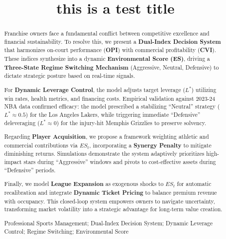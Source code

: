 \documentclass{mcmthesis}
\title{this is a test title}
\begin{document}
\begin{abstract}
Franchise owners face a fundamental conflict between competitive excellence and financial sustainability. To resolve this, we present a \textbf{Dual-Index Decision System} that harmonizes on-court performance (\textbf{OPI}) with commercial profitability (\textbf{CVI}). These indices synthesize into a dynamic \textbf{Environmental Score (ES)}, driving a \textbf{Three-State Regime Switching Mechanism} (Aggressive, Neutral, Defensive) to dictate strategic posture based on real-time signals.

For \textbf{Dynamic Leverage Control}, the model adjusts target leverage ($L^*$) utilizing win rates, health metrics, and financing costs. Empirical validation against 2023-24 NBA data confirmed efficacy: the model prescribed a stabilizing ``Neutral'' strategy ($L^* \approx 0.5$) for the Los Angeles Lakers, while triggering immediate ``Defensive'' deleveraging ($L^* \approx 0$) for the injury-hit Memphis Grizzlies to preserve solvency.

Regarding \textbf{Player Acquisition}, we propose a framework weighting athletic and commercial contributions via $ES_t$, incorporating a \textbf{Synergy Penalty} to mitigate diminishing returns. Simulations demonstrate the system adaptively prioritizes high-impact stars during ``Aggressive'' windows and pivots to cost-effective assets during ``Defensive'' periods.

Finally, we model \textbf{League Expansion} as exogenous shocks to $ES_t$ for automatic recalibration and integrate \textbf{Dynamic Ticket Pricing} to balance premium revenue with occupancy. This closed-loop system empowers owners to navigate uncertainty, transforming market volatility into a strategic advantage for long-term value creation.

\begin{keywords}
Professional Sports Management; Dual-Index Decision System; Dynamic Leverage Control; Regime Switching; Environmental Score
\end{keywords}
\end{abstract}
\maketitle
 \tableofcontents
 \newpage


\end{document}
